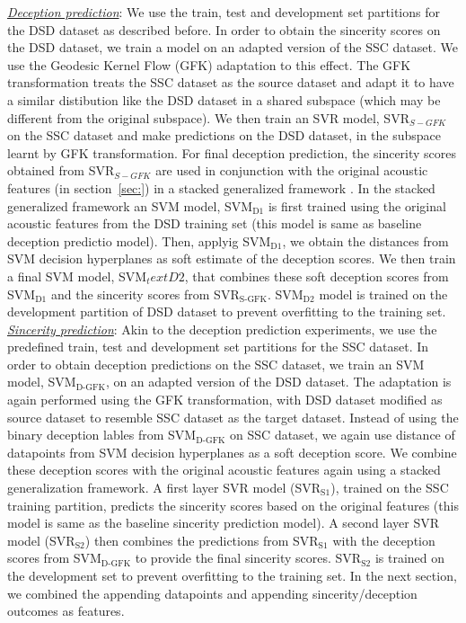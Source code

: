 \documentclass{article}
\begin{document}
\noindent\underline{\it Deception prediction}: 
We use the train, test and development set partitions for the DSD dataset as described before.
In order to obtain the sincerity scores on the DSD dataset, we train a model on an adapted version of the SSC dataset.
We use the Geodesic Kernel Flow (GFK) adaptation \cite{} to this effect.
The GFK transformation treats the SSC dataset as the source dataset and adapt it to have a similar distibution like the DSD dataset in a shared subspace (which may be different from the original subspace). 
We then train an SVR model, SVR$_{S-GFK}$ on the SSC dataset and make predictions on the DSD dataset, in the subspace learnt by GFK transformation.
For final deception prediction, the sincerity scores obtained from SVR$_{S-GFK}$ are used in conjunction with the original acoustic features (in section~\ref{sec:}) in a stacked generalized framework \cite{}.
In the stacked generalized framework an SVM model, SVM$_\text{D1}$ is first trained using the original acoustic features from the DSD training set (this model is same as baseline deception predictio model).
Then, applyig SVM$_\text{D1}$, we obtain the distances from SVM decision hyperplanes as soft estimate of the deception scores. 
We then train a final SVM model, SVM$_text{D2}$, that combines these soft deception scores from SVM$_\text{D1}$ and the sincerity scores from SVR$_\text{S-GFK}$.
SVM$_\text{D2}$ model is trained on the development partition of DSD dataset to prevent overfitting to the training set. 
\\

\noindent\underline{\it Sincerity prediction}:
Akin to the deception prediction experiments, we use the predefined train, test and development set partitions for the SSC dataset.
In order to obtain deception predictions on the SSC dataset, we train an SVM model, SVM$_\text{D-GFK}$, on an adapted version of the DSD dataset.
The adaptation is again performed using the GFK transformation, with DSD dataset modified as source dataset to resemble SSC dataset as the target dataset.
Instead of using the binary deception lables from SVM$_\text{D-GFK}$ on SSC dataset, we again use distance of datapoints from SVM decision hyperplanes as a soft deception score. 
We combine these deception scores with the original acoustic features again using a stacked generalization framework. 
A first layer SVR model (SVR$_\text{S1}$), trained on the SSC training partition, predicts the sincerity scores based on the original features (this model is same as the baseline sincerity prediction model). 
A second layer SVR model (SVR$_\text{S2}$) then combines the predictions from SVR$_\text{S1}$ with the deception scores from SVM$_\text{D-GFK}$ to provide the final sincerity scores.  
SVR$_\text{S2}$ is trained on the development set to prevent overfitting to the training set. 
In the next section, we combined the appending datapoints and appending sincerity/deception outcomes as features. 
\end{document}
